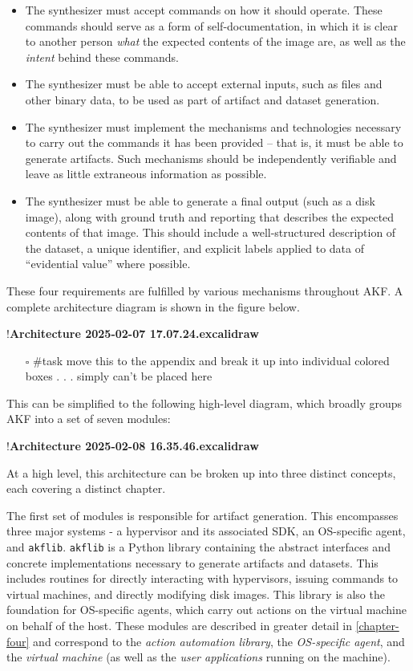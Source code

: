 \documentclass[letterpaper,12pt]{report}
\def\tightlist{}
\newcommand{\passthrough}[1]{#1}
\begin{document}
\begin{itemize}
\tightlist
\item
  The synthesizer must accept commands on how it should operate. These
  commands should serve as a form of self-documentation, in which it is
  clear to another person \emph{what} the expected contents of the image
  are, as well as the \emph{intent} behind these commands.
\item
  The synthesizer must be able to accept external inputs, such as files
  and other binary data, to be used as part of artifact and dataset
  generation.
\item
  The synthesizer must implement the mechanisms and technologies
  necessary to carry out the commands it has been provided -- that is,
  it must be able to generate artifacts. Such mechanisms should be
  independently verifiable and leave as little extraneous information as
  possible.
\item
  The synthesizer must be able to generate a final output (such as a
  disk image), along with ground truth and reporting that describes the
  expected contents of that image. This should include a well-structured
  description of the dataset, a unique identifier, and explicit labels
  applied to data of ``evidential value'' where possible.
\end{itemize}

These four requirements are fulfilled by various mechanisms throughout
AKF. A complete architecture diagram is shown in the figure below.

!\textbf{Architecture 2025-02-07 17.07.24.excalidraw}

\begin{itemize}
\tightlist
\item[$\square$]
  \#task move this to the appendix and break it up into individual
  colored boxes . . . simply can't be placed here
\end{itemize}

This can be simplified to the following high-level diagram, which
broadly groups AKF into a set of seven modules:

!\textbf{Architecture 2025-02-08 16.35.46.excalidraw}

At a high level, this architecture can be broken up into three distinct
concepts, each covering a distinct chapter.

The first set of modules is responsible for artifact generation. This
encompasses three major systems - a hypervisor and its associated SDK,
an OS-specific agent, and \passthrough{\lstinline!akflib!}.
\passthrough{\lstinline!akflib!} is a Python library containing the
abstract interfaces and concrete implementations necessary to generate
artifacts and datasets. This includes routines for directly interacting
with hypervisors, issuing commands to virtual machines, and directly
modifying disk images. This library is also the foundation for
OS-specific agents, which carry out actions on the virtual machine on
behalf of the host. These modules are described in greater detail in
\autoref{chapter-four} and correspond to the \emph{action
automation library}, the \emph{OS-specific agent}, and the \emph{virtual
machine} (as well as the \emph{user applications} running on the
machine).
\end{document}
